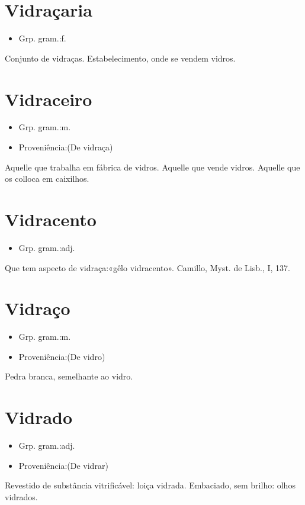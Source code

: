 \documentclass{article}
\begin{document}
\section{Vidraçaria}
\begin{itemize}
\item {Grp. gram.:f.}
\end{itemize}
Conjunto de vidraças.
Estabelecimento, onde se vendem vidros.
\section{Vidraceiro}
\begin{itemize}
\item {Grp. gram.:m.}
\end{itemize}
\begin{itemize}
\item {Proveniência:(De \textunderscore vidraça\textunderscore )}
\end{itemize}
Aquelle que trabalha em fábrica de vidros.
Aquelle que vende vidros.
Aquelle que os colloca em caixilhos.
\section{Vidracento}
\begin{itemize}
\item {Grp. gram.:adj.}
\end{itemize}
Que tem aspecto de vidraça:«\textunderscore gêlo vidracento\textunderscore ». Camillo, \textunderscore Myst. de Lisb.\textunderscore , I, 137.
\section{Vidraço}
\begin{itemize}
\item {Grp. gram.:m.}
\end{itemize}
\begin{itemize}
\item {Proveniência:(De \textunderscore vidro\textunderscore )}
\end{itemize}
Pedra branca, semelhante ao vidro.
\section{Vidrado}
\begin{itemize}
\item {Grp. gram.:adj.}
\end{itemize}
\begin{itemize}
\item {Proveniência:(De \textunderscore vidrar\textunderscore )}
\end{itemize}
Revestido de substância vitrificável: \textunderscore loiça vidrada\textunderscore .
Embaciado, sem brilho: \textunderscore olhos vidrados\textunderscore .
\end{document}
